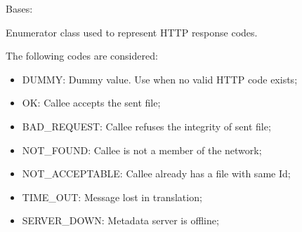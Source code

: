 \documentclass[letterpaper,10pt,english]{sphinxmanual}
\begin{document}
\begin{fulllineitems}
\label{\detokenize{app.domain.helpers:app.domain.helpers.enums.HttpCodes}}
Bases: 

Enumerator class used to represent HTTP response codes.

The following codes are considered:
\begin{itemize}
\item {} 
DUMMY: Dummy value. Use when no valid HTTP code exists;

\item {} 
OK: Callee accepts the sent file;

\item {} 
BAD\_REQUEST: Callee refuses the integrity of sent file;

\item {} 
NOT\_FOUND: Callee is not a member of the network;

\item {} 
NOT\_ACCEPTABLE: Callee already has a file with same Id;

\item {} 
TIME\_OUT: Message lost in translation;

\item {} 
SERVER\_DOWN: Metadata server is offline;

\end{itemize}

\begin{fulllineitems}
\label{\detokenize{app.domain.helpers:app.domain.helpers.enums.HttpCodes.BAD_REQUEST}}
\end{fulllineitems}


\begin{fulllineitems}
\label{\detokenize{app.domain.helpers:app.domain.helpers.enums.HttpCodes.DUMMY}}
\end{fulllineitems}


\end{fulllineitems}
\end{document}
